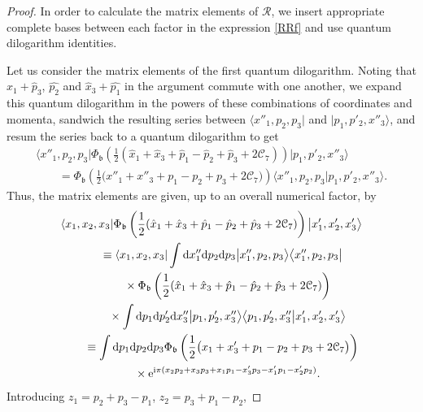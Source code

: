 \documentclass[pdftex]{sigma}
\newcommand{\bb}{{\mathfrak b}}
\newcommand{\e}{{\mathrm e}}
\numberwithin{equation}{section}
\begin{document}
\begin{proof}
 In order to calculate the matrix elements of $\mathcal{R}$, we
 insert appropriate complete bases between each factor in the
 expression \eqref{RRf} and use quantum dilogarithm identities.

 Let us consider the matrix elements of the first quantum
 dilogarithm. Noting that $\hat{x}_1 + \hat{p}_3$, $\hat{p_2}$ and
 $\hat{x}_3 + \hat{p_1}$ in the argument commute with one another, we
 expand this quantum dilogarithm in the powers of these combinations
 of coordinates and momenta, sandwich the resulting series between
 $\bigl\langle x''_1, p_2, p_3\bigr|$ and $\bigl|p_1, p'_2, x''_3 \bigr\rangle$, and
 resum the series back to a quantum dilogarithm to get
 \begin{gather*}
 \bigl\langle x''_1, p_2, p_3\bigr|
 \Phi_\bb\left(\frac{1}{2}(\hat{x}_1 + \hat{x}_3 + \hat{p}_1 - \hat{p}_2 + \hat{p}_3 +2\mathcal{C}_7)\right)
 \bigl|p_1, p'_2, x''_3 \bigr\rangle
 \\
 \qquad =
 \Phi_\bb\left(\frac{1}{2}\bigl(x''_1 + x''_3 + p_1 - p_2 + p_3 +2\mathcal{C}_7\bigr)\right)
 \bigl\langle x''_1, p_2, p_3|p_1, p'_2, x''_3 \bigr\rangle.
 \end{gather*}
 Thus, the matrix elements are given, up to an overall numerical
 factor, by
 \begin{gather*}
 \langle x_1, x_2, x_3|
 \Phi_\bb\left(\frac{1}{2}(\hat{x}_1 + \hat{x}_3
 + \hat{p}_1 - \hat{p}_2 + \hat{p}_3 +2\mathcal{C}_7)\right)
 \bigl|x'_1, x'_2, x'_3 \bigr\rangle
 \\
\qquad
 \equiv \langle x_1, x_2, x_3| \int {\rm d}x''_1 {\rm d}p_2 {\rm d}p_3
 \bigl|x''_1, p_2, p_3 \bigr\rangle \bigl\langle x''_1, p_2, p_3 \bigr|
 \\
\phantom{\qquad
 \equiv}{} \times
 \Phi_\bb\left(\frac{1}{2}(\hat{x}_1 + \hat{x}_3
 + \hat{p}_1 - \hat{p}_2 + \hat{p}_3 +2\mathcal{C}_7)\right)\\
\phantom{\qquad
 \equiv}{} \times
 \int {\rm d}p_1 {\rm d}p'_2 {\rm d}x''_3 \bigl|p_1 , p'_2 , x''_3 \bigr\rangle
 \bigl\langle p_1 , p'_2 , x''_3\bigr|x'_1, x'_2, x'_3 \bigr\rangle
 \\
 \qquad
 \equiv
 \int {\rm d}p_1 {\rm d}p_2 {\rm d}p_3
 \Phi_\bb\left(\frac{1}{2}\bigl(x_1 + x'_3 + p_1 - p_2 + p_3 +2\mathcal{C}_7\bigr)\right)\\
 \phantom{\qquad
 \equiv}{} \times
 \e^{{\rm i}\pi(x_2 p_2 +x_3 p_3 + x_1 p_1 - x'_3 p_3 - x'_1 p_1 -x'_2 p_2)}
 .
 \end{gather*}
 Introducing $z_1 = p_2 + p_3 - p_1$, $z_2 = p_3 + p_1 - p_2$,

\end{proof}
\end{document}

